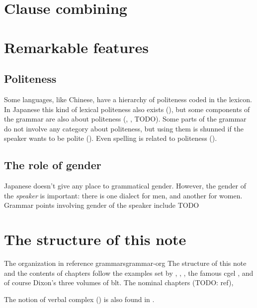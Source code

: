 \documentclass[UTF8, a4paper, oneside, scheme=plain]{ctexrep}
\begin{document}
\section{Clause combining}

\section{Remarkable features}

\subsection{Politeness}

Some languages, like Chinese, have a hierarchy of politeness coded in the lexicon.
In Japanese this kind of lexical politeness also exists (),
but some components of the grammar are also about politeness
(, , TODO).
Some parts of the grammar do not involve any category about politeness,
but using them is shunned if the speaker wants to be polite
().
Even spelling is related to politeness ().

\subsection{The role of gender}

Japanese doesn't give any place to grammatical gender.
However, the gender of the \emph{speaker} is important:
there is one dialect for men,
and another for women.
Grammar points involving gender of the speaker include TODO

\section{The structure of this note}

\begin{theorybox}{The organization in reference grammars}{grammar-org}
    The structure of this note and the contents of chapters follow 
    the examples set by \citet{Friesen2017}, \citet{jacques2021grammar}, \citet{Grimm2021},
    the famous \acs{cgel} \citep{cgel}, and of course Dixon's three volumes of \acs{blt}.
    The nominal chapters (TODO: ref), 
    
    The notion of verbal complex () is also found in 
    \citet{Friesen2017}.
\end{theorybox}
\end{document}
